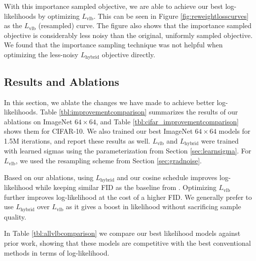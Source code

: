 \documentclass{article}
\begin{document}
With this importance sampled objective, we are able to achieve our best log-likelihoods by optimizing $L_{\text{vlb}}$. This can be seen in Figure \ref{fig:reweightlosscurves} as the $L_{\text{vlb}}$ (resampled) curve. The figure also shows that the importance sampled objective is considerably less noisy than the original, uniformly sampled objective. We found that the importance sampling technique was not helpful when optimizing the less-noisy $L_{\text{hybrid}}$ objective directly.

\subsection{Results and Ablations}
\label{sec:summarizing}

In this section, we ablate the changes we have made to achieve better log-likelihoods. Table \ref{tbl:improvementcomparison} summarizes the results of our ablations on ImageNet $64 \times 64$, and Table \ref{tbl:cifar_improvementcomparison} shows them for CIFAR-10. We also trained our best ImageNet $64 \times 64$ models for 1.5M iterations, and report these results as well. $L_{\text{vlb}}$ and $L_{\text{hybrid}}$ were trained with learned sigmas using the parameterization from Section \ref{sec:learnsigma}. For $L_{\text{vlb}}$, we used the resampling scheme from Section \ref{sec:gradnoise}.

Based on our ablations, using $L_{\text{hybrid}}$ and our cosine schedule improves log-likelihood while keeping similar FID as the baseline from \citet{ddpm}. Optimizing $L_{\text{vlb}}$ further improves log-likelihood at the cost of a higher FID. We generally prefer to use $L_{\text{hybrid}}$ over $L_{\text{vlb}}$ as it gives a boost in likelihood without sacrificing sample quality. 

In Table \ref{tbl:allvlbcomparison} we compare our best likelihood models against prior work, showing that these models are competitive with the best conventional methods in terms of log-likelihood.
\end{document}
